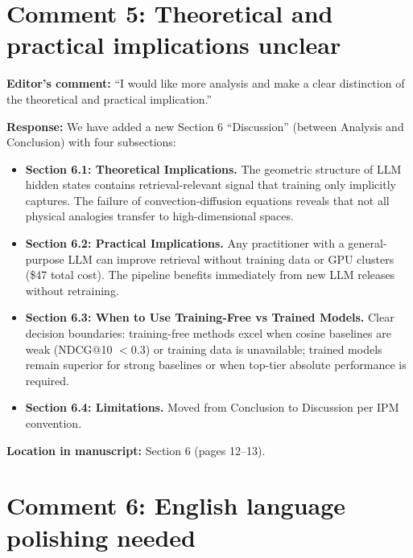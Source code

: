 \documentclass[11pt]{article}
\begin{document}
\section*{Comment 5: Theoretical and practical implications unclear}

\textbf{Editor's comment:} ``I would like more analysis and make a clear distinction of the theoretical and practical implication.''

\textbf{Response:} We have added a new Section 6 ``Discussion'' (between Analysis and Conclusion) with four subsections:

\begin{itemize}[leftmargin=*]
\item \textbf{Section 6.1: Theoretical Implications.} The geometric structure of LLM hidden states contains retrieval-relevant signal that training only implicitly captures. The failure of convection-diffusion equations reveals that not all physical analogies transfer to high-dimensional spaces.

\item \textbf{Section 6.2: Practical Implications.} Any practitioner with a general-purpose LLM can improve retrieval without training data or GPU clusters (\$47 total cost). The pipeline benefits immediately from new LLM releases without retraining.

\item \textbf{Section 6.3: When to Use Training-Free vs Trained Models.} Clear decision boundaries: training-free methods excel when cosine baselines are weak (NDCG@10 $< 0.3$) or training data is unavailable; trained models remain superior for strong baselines or when top-tier absolute performance is required.

\item \textbf{Section 6.4: Limitations.} Moved from Conclusion to Discussion per IPM convention.
\end{itemize}

\textbf{Location in manuscript:} Section 6 (pages 12--13).

\section*{Comment 6: English language polishing needed}
\end{document}

